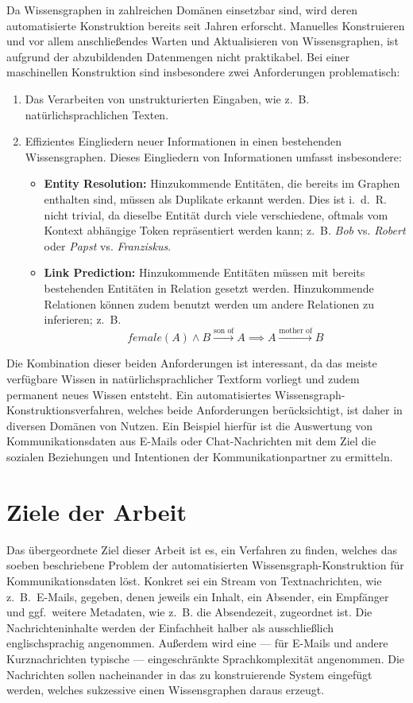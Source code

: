 Da Wissensgraphen in zahlreichen Domänen einsetzbar sind, wird deren automatisierte Konstruktion bereits seit Jahren erforscht.
Manuelles Konstruieren und vor allem anschließendes Warten und Aktualisieren von Wissensgraphen, ist aufgrund der abzubildenden Datenmengen nicht praktikabel.
Bei einer maschinellen Konstruktion sind insbesondere zwei Anforderungen problematisch:
\begin{enumerate}
	\item Das Verarbeiten von unstrukturierten Eingaben, wie z.~B. natürlichsprachlichen Texten.
	\item Effizientes Eingliedern neuer Informationen in einen bestehenden Wissensgraphen.
		Dieses Eingliedern von Informationen umfasst insbesondere:
		\begin{itemize}
			\item \textbf{Entity Resolution:}
				Hinzukommende Entitäten, die bereits im Graphen enthalten sind, müssen als Duplikate erkannt werden.
				Dies ist i.~d.~R. nicht trivial, da dieselbe Entität durch viele verschiedene, oftmals vom Kontext abhängige Token repräsentiert werden kann;
				z.~B. \textit{Bob} vs. \textit{Robert} oder \textit{Papst} vs. \textit{Franziskus}.
			\item \textbf{Link Prediction:}
				Hinzukommende Entitäten müssen mit bereits bestehenden Entitäten in Relation gesetzt werden.
				Hinzukommende Relationen können zudem benutzt werden um andere Relationen zu inferieren;
				z.~B. \[\mathit{female}(A) \land B \xrightarrow{\text{son~of}} A \implies A \xrightarrow{\text{mother~of}} B\]
		\end{itemize}
\end{enumerate}

Die Kombination dieser beiden Anforderungen ist interessant, da das meiste verfügbare Wissen in natürlichsprachlicher Textform vorliegt und zudem permanent neues Wissen entsteht.
Ein automatisiertes Wissensgraph-Konstruktionsverfahren, welches beide Anforderungen berücksichtigt, ist daher in diversen Domänen von Nutzen.
Ein Beispiel hierfür ist die Auswertung von Kommunikationsdaten aus E-Mails oder Chat-Nachrichten mit dem Ziel die sozialen Beziehungen und Intentionen der Kommunikationpartner zu ermitteln.

\section{Ziele der Arbeit}%
\label{sec:intro:goals}

Das übergeordnete Ziel dieser Arbeit ist es, ein Verfahren zu finden, welches das soeben beschriebene Problem der automatisierten Wissensgraph-Konstruktion für Kommunikationsdaten löst.
Konkret sei ein Stream von Textnachrichten, wie z.~B.\ E-Mails, gegeben, denen jeweils ein Inhalt, ein Absender, ein Empfänger und ggf.\ weitere Metadaten, wie z.~B. die Absendezeit, zugeordnet ist.
Die Nachrichteninhalte werden der Einfachheit halber als ausschließlich englischsprachig angenommen.
Außerdem wird eine --- für E-Mails und andere Kurznachrichten typische --- eingeschränkte Sprachkomplexität angenommen.
Die Nachrichten sollen nacheinander in das zu konstruierende System eingefügt werden, welches sukzessive einen Wissensgraphen daraus erzeugt.

